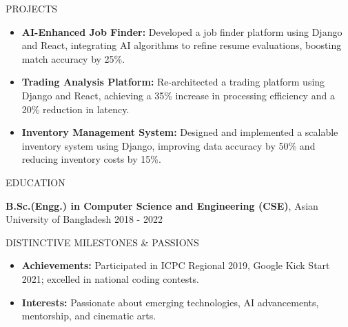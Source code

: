 \documentclass{resume} %
\begin{document}
\begin{rSection}{PROJECTS}

\begin{itemize}
    \item \textbf{AI-Enhanced Job Finder:} Developed a job finder platform using Django and React, integrating AI algorithms to refine resume evaluations, boosting match accuracy by 25\%.
    \item \textbf{Trading Analysis Platform:} Re-architected a trading platform using Django and React, achieving a 35\% increase in processing efficiency and a 20\% reduction in latency.
    \item \textbf{Inventory Management System:} Designed and implemented a scalable inventory system using Django, improving data accuracy by 50\% and reducing inventory costs by 15\%.
\end{itemize}

\end{rSection} 


\begin{rSection}{EDUCATION}

{\bf B.Sc.(Engg.) in Computer Science and Engineering (CSE)}, Asian University of Bangladesh \hfill {2018 - 2022}

\end{rSection}


\begin{rSection}{DISTINCTIVE MILESTONES \& PASSIONS}

\begin{itemize}
    \item \textbf{Achievements:} Participated in ICPC Regional 2019, Google Kick Start 2021; excelled in national coding contests.
    \item \textbf{Interests:} Passionate about emerging technologies, AI advancements, mentorship, and cinematic arts.
\end{itemize}

\end{rSection}
\end{document}
